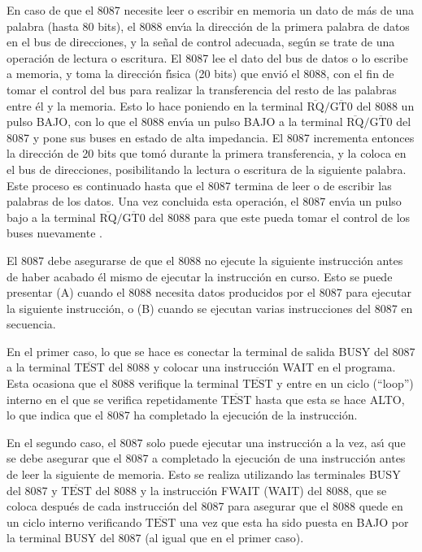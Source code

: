 En caso de que el 8087 necesite leer o escribir en memoria un dato de m\'as de una palabra %
(hasta 80 bits), el 8088 env\'{\i}a la direcci\'on de la primera palabra de datos en el bus de %
direcciones, y la se\~nal de control adecuada, seg\'un se trate de una operaci\'on de lectura o %
escritura. El 8087 lee el dato del bus de datos o lo escribe a memoria, y toma la direcci\'on %
f\'{\i}sica (20 bits) que envi\'o el 8088, con el fin de tomar el control del bus para %
realizar la transferencia del resto de las palabras entre \'el y la memoria. Esto lo hace %
poniendo en la terminal $\overline{\mbox{RQ}}/\overline{\mbox{GT0}}$ del 8088 un pulso %
BAJO, con lo que el 8088 env\'{\i}a un pulso BAJO a la terminal %
$\overline{\mbox{RQ}}/\overline{\mbox{GT0}}$ del 8087 y pone sus buses en estado de %
alta impedancia. El 8087 incrementa entonces la direcci\'on de 20 bits que tom\'o durante la %
primera transferencia, y la coloca en el bus de direcciones, posibilitando la lectura o %
escritura de la siguiente palabra. Este proceso es continuado hasta que el 8087 termina de leer %
o de escribir las palabras de los datos. Una vez concluida esta operaci\'on, el 8087 %
env\'{\i}a un pulso bajo a la terminal $\overline{\mbox{RQ}}/\overline{\mbox{GT0}}$ %
del 8088 para que este pueda tomar el control de los buses nuevamente \cite{Hall}.

El 8087 debe asegurarse de que el 8088 no ejecute la siguiente instrucci\'on antes de haber %
acabado \'el mismo de ejecutar la instrucci\'on en curso. Esto se puede presentar (A) cuando el %
8088 necesita datos producidos por el 8087 para ejecutar la siguiente instrucci\'on, o (B) %
cuando se ejecutan varias ins\-truc\-cio\-nes del 8087 en secuencia. 

En el primer caso, lo que se hace es conectar la terminal de salida BUSY del 8087 a la terminal %
$\overline{\mbox{TEST}}$ del 8088 y colocar una instrucci\'on WAIT en el programa. Esta %
ocasiona que el 8088 verifique la terminal $\overline{\mbox{TEST}}$ y entre en un ciclo %
(``loop'') interno en el que se verifica repetidamente $\overline{\mbox{TEST}}$ hasta que %
esta se hace ALTO, lo que indica que el 8087 ha completado la ejecuci\'on de la instrucci\'on. 

En el segundo caso, el 8087 solo puede ejecutar una instrucci\'on a la vez, as\'{\i} que se %
debe asegurar que el 8087 a completado la ejecuci\'on de una instrucci\'on antes de leer la %
siguiente de memoria. Esto se realiza utilizando las terminales BUSY del 8087 y %
$\overline{\mbox{TEST}}$ del 8088 y la instrucci\'on FWAIT (WAIT) del 8088, que se coloca %
despu\'es de cada instrucci\'on del 8087 para asegurar que el 8088 quede en un ciclo interno %
verificando $\overline{\mbox{TEST}}$ una vez que esta ha sido puesta en BAJO por la %
terminal BUSY del 8087 (al igual que en el primer caso). 

